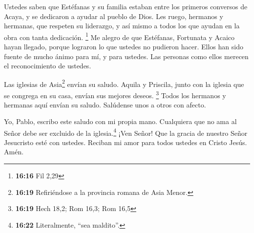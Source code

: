  Ustedes saben que Estéfanas y su familia estaban entre
los primeros conversos de Acaya, y se dedicaron a ayudar al pueblo de
Dios. Les ruego, hermanos y hermanas,  que respeten su
liderazgo, y así mismo a todos los que ayudan en la obra con tanta
dedicación. \footnote{\textbf{16:16} Fil 2,29}  Me alegro
de que Estéfanas, Fortunata y Acaico hayan llegado, porque lograron lo
que ustedes no pudieron hacer.  Ellos han sido fuente de
mucho ánimo para mí, y para ustedes. Las personas como ellos merecen el
reconocimiento de ustedes.

 Las iglesias de Asia\footnote{\textbf{16:19}
  Refiriéndose a la provincia romana de Asia Menor.} envían su saludo.
Aquila y Priscila, junto con la iglesia que se congrega en su casa,
envían sus mejores deseos. \footnote{\textbf{16:19} Hech 18,2; Rom 16,3;
  Rom 16,5}  Todos los hermanos y hermanas aquí envían su
saludo. Salúdense unos a otros con afecto.

 Yo, Pablo, escribo este saludo con mi propia mano.
 Cualquiera que no ama al Señor debe ser excluido de la
iglesia.\footnote{\textbf{16:22} Literalmente, ``sea maldito''.} ¡Ven
Señor!  Que la gracia de nuestro Señor Jesucristo esté
con ustedes.  Reciban mi amor para todos ustedes en
Cristo Jesús. Amén.
